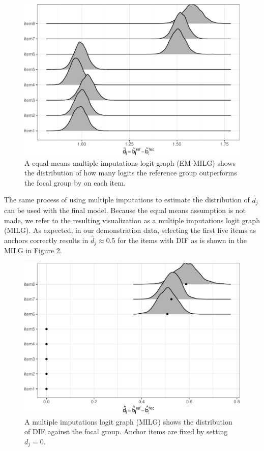 \documentclass[
  11pt,
]{article}
\begin{document}
\begin{figure}[H]

{\centering \includegraphics[width=0.7\linewidth]{paper_files/figure-latex/emmilg-1} 

}

\caption{A equal means multiple imputations logit graph (EM-MILG) shows the distribution of how many logits the reference group outperforms the focal group by on each item.}\label{fig:emmilg}
\end{figure}

The same process of using multiple imputations to estimate the distribution of \(\tilde{d_j}\) can be used with the final model. Because the equal means assumption is not made, we refer to the resulting visualization as a multiple imputations logit graph (MILG). As expected, in our demonstration data, selecting the first five items as anchors correctly results in \(\hat d_j \approx 0.5\) for the items with DIF as is shown in the MILG in Figure \ref{fig:milg}.

\begin{figure}[H]

{\centering \includegraphics[width=0.7\linewidth]{paper_files/figure-latex/milg-1} 

}

\caption{A multiple imputations logit graph (MILG) shows the distribution of DIF against the focal group. Anchor items are fixed by setting $d_j = 0$.}\label{fig:milg}
\end{figure}
\end{document}
